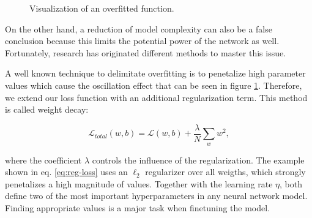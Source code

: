 \begin{figure}[htpb]
  \centering
  \caption[Regularization and overfitting]{Visualization of an overfitted function.}\label{fig:overfitting}
\end{figure}

On the other hand, a reduction of model complexity can also be a false conclusion because this limits the potential power of the network as well. Fortunately, research has originated different methods to master this issue.

A well known technique to delimitate overfitting is to penetalize high parameter values which cause the oscillation effect that can be seen in figure \ref{fig:overfitting}. Therefore, we extend our loss function with an additional regularization term. This method is called weight decay:

\begin{equation} \label{eq:reg-loss}
  \mathcal{L}_{total}(w, b)= \mathcal{L}(w, b) + \frac{\lambda}{N} \sum\limits_{w}w^2 ,
\end{equation}

where the coefficient $ \lambda $ controls the influence of the regularization. The example shown in eq. \ref{eq:reg-loss} uses an $ \ell_{2} $ regularizer over all weigths, which strongly penetalizes a high magnitude of values. Together with the learning rate $ \eta $, both define two of the most important hyperparameters in any neural network model. Finding appropriate values is a major task when finetuning the model.

